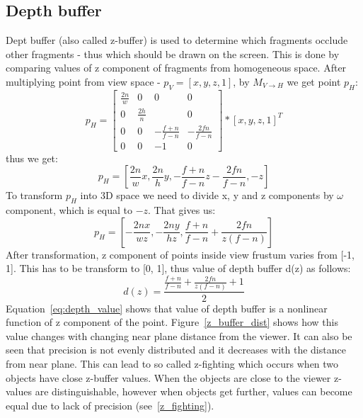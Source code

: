 \subsection{Depth buffer} \label{sec:depth_buffer}
Dept buffer (also called z-buffer) is used to determine which fragments occlude other fragments - thus which should be drawn on the screen. This is done by comparing values of z component of fragments from homogeneous space. 
After multiplying point from view space - $p_V = [x, y, z, 1]$,  by $M_{V \to H}$ we get point $p_H$:
\begin{equation}
\label{eg:projection_transformation}
p_H =
\begin{bmatrix}
\frac{2n}{w} & 0            & 0                & 0                \\ 
0            & \frac{2h}{n} &                  & 0                 \\ 
0            & 0            & -\frac{f+n}{f-n} & -\frac{2fn}{f-n} \\ 
0            & 0            & -1               & 0
\end{bmatrix}
*[x, y, z, 1]^T
\end{equation}
thus we get:
\begin{equation}
\label{eg:after_perspective_projection}
p_H = [\frac{2n}{w}x, \frac{2n}{h}y, -\frac{f+n}{f-n}z - \frac{2fn}{f-n}, -z]
\end{equation}
To transform $p_H$ into 3D space we need to divide x, y and z components by $\omega$ component, which is equal to $-z$. That gives us:
\begin{equation}
\label{eg:after_perspective_projection}
p_H = [-\frac{2nx}{wz},-\frac{2ny}{hz}, \frac{f+n}{f-n} + \frac{2fn}{z(f-n)}]
\end{equation}
After transformation, z component of points inside view frustum varies from [-1, 1]. This has to be transform to [0, 1], thus value of depth buffer d(z) as follows:
\begin{equation}
\label{eq:depth_value}
d(z) = \frac{\frac{f+n}{f-n} + \frac{2fn}{z(f-n)} + 1}{2}
\end{equation}
Equation~\ref{eq:depth_value} shows that value of depth buffer is a nonlinear function of z component of the point. Figure~\ref{z_buffer_dist} shows how this value changes with changing near plane distance from the viewer. It can also be seen that precision is not evenly distributed and it decreases with the distance from near plane. This can lead to so called z-fighting which occurs when two objects have close z-buffer values. When the objects are close to the viewer z-values are distinguishable, however when objects get further, values can become equal due to lack of precision (see~\ref{z_fighting}).

